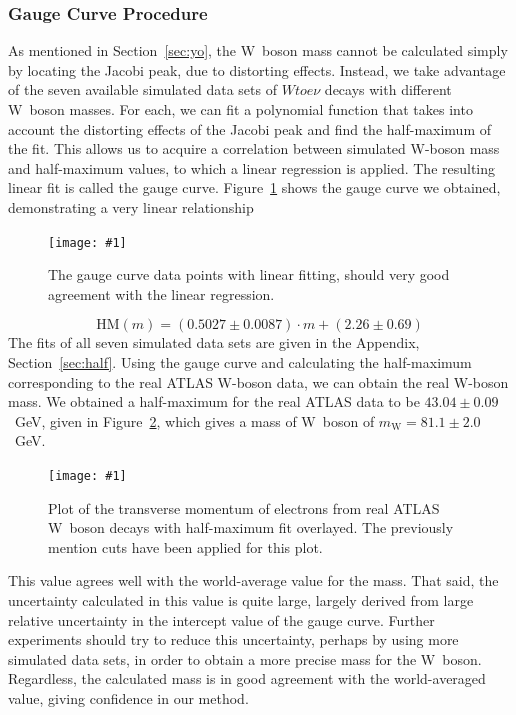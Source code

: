 \documentclass[twocolumn]{article}
\newcommand{\insertFigure}[1]{%
   \texttt{[image: \#1]}%
}
\begin{document}
\subsubsection{Gauge Curve Procedure} \label{sec:Wmass}
As mentioned in Section~\ref{sec:yo}, the W~boson mass cannot be calculated simply by locating the Jacobi peak, due to distorting effects. Instead, we take advantage of the seven available simulated data sets of $W to e\nu$ decays with different W~boson masses. For each, we can fit a polynomial function that takes into account the distorting effects of the Jacobi peak and find the half-maximum of the fit. This allows us to acquire a correlation between simulated W-boson mass and half-maximum values, to which a linear regression is applied. The resulting linear fit is called the gauge curve. Figure~\ref{fig:gaugecurve} shows the gauge curve we obtained, demonstrating a very linear relationship
\begin{figure}[!h]
	\centering
	\insertFigure{Images/Jacobihalfmax.png}
	\caption{The gauge curve data points with linear fitting, should very good agreement with the linear regression.}
	\label{fig:gaugecurve}
\end{figure}
\begin{equation}\nonumber
\text{HM}(m) = (0.5027 \pm 0.0087)\cdot m + (2.26 \pm 0.69)
\end{equation}
The fits of all seven simulated data sets are given in the Appendix, Section~\ref{sec:half}. Using the gauge curve and calculating the half-maximum corresponding to the real ATLAS W-boson data, we can obtain the real W-boson mass. We obtained a half-maximum for the real ATLAS data to be $43.04 \pm 0.09$~GeV, given in Figure~\ref{fig:halfW}, which gives a mass of W~boson of $m_\text{W} = 81.1 \pm 2.0$~GeV. 
\begin{figure}[!h]
	\centering
	\insertFigure{Images/Wmass.png}
	\caption{Plot of the transverse momentum of electrons from real ATLAS W~boson decays with half-maximum fit overlayed. The previously mention cuts have been applied for this plot.}
	\label{fig:halfW}
\end{figure}
This value agrees well with the world-average value for the mass. That said, the uncertainty calculated in this value is quite large, largely derived from large relative uncertainty in the intercept value of the gauge curve. Further experiments should try to reduce this uncertainty, perhaps by using more simulated data sets, in order to obtain a more precise mass for the W~boson. Regardless, the calculated mass is in good agreement with the world-averaged value, giving confidence in our method.\\
\end{document}
